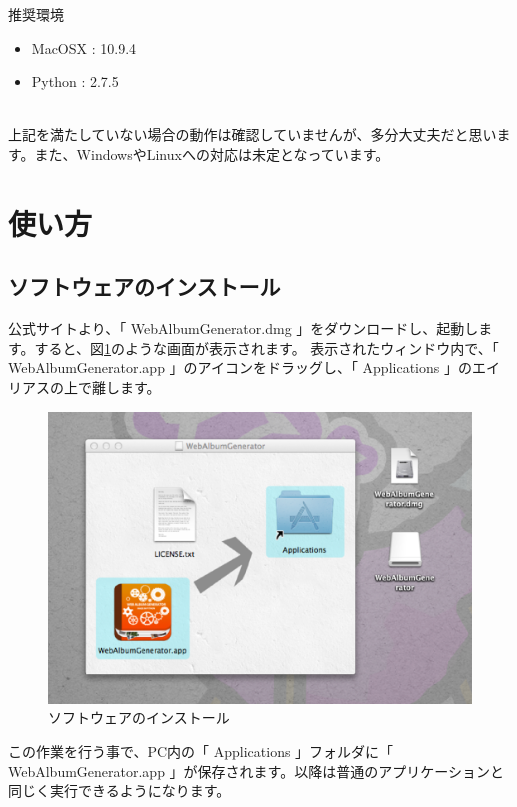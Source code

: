 \documentclass[]{jsarticle}
\begin{document}
\begin{itembox}[l]{推奨環境}
 \begin{itemize}
   \item MacOSX : 10.9.4
   \item Python : 2.7.5
 \end{itemize}
\end{itembox} \\

上記を満たしていない場合の動作は確認していませんが、多分大丈夫だと思います。また、WindowsやLinuxへの対応は未定となっています。

\section{使い方}

\subsection{ソフトウェアのインストール}

公式サイトより、「 WebAlbumGenerator.dmg 」をダウンロードし、起動します。すると、図\ref{fig:ex1}のような画面が表示されます。
表示されたウィンドウ内で、「 WebAlbumGenerator.app 」のアイコンをドラッグし、「 Applications 」のエイリアスの上で離します。\\

\begin{figure}[htbp] %
 \begin{center}
  \includegraphics[width=120mm]{images/ex1.eps}
 \end{center}
 \caption{ソフトウェアのインストール}
 \label{fig:ex1}
\end{figure}

この作業を行う事で、PC内の「 Applications 」フォルダに「 WebAlbumGenerator.app 」が保存されます。以降は普通のアプリケーションと
同じく実行できるようになります。\newpage
\end{document}
